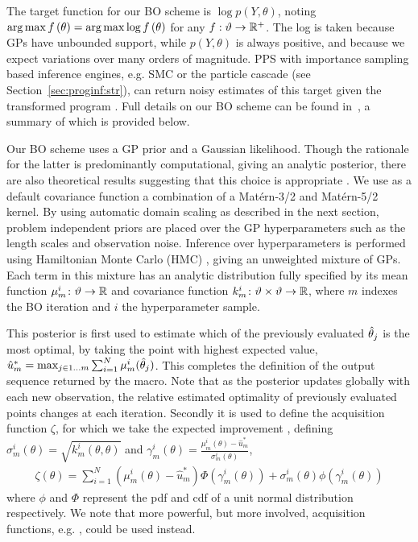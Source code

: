 
The target function for our BO scheme is $\log p(Y,\theta)$, noting $\operatorname*{arg\,max} f\left(\theta\right) = \operatorname*{arg\,max} \log f\left(\theta\right)$ for any $f : \vartheta \rightarrow \mathbb{R}^+$.  The log is taken because GPs have unbounded support, while $p\left(Y,\theta\right)$ is always positive, and because we expect variations over many orders of magnitude.  PPS with importance sampling based inference engines, e.g. SMC or the particle cascade (see Section~\ref{sec:proginf:str}), can return noisy estimates of this target given the transformed program \qmarg.   Full details on our BO scheme can be found
in~\cite{rainforth2017boppArxiv}, a summary of which is provided below.

Our BO scheme uses a GP prior and a Gaussian likelihood.  Though the rationale for the latter is predominantly computational, giving an analytic posterior, there are also theoretical results suggesting that this choice is appropriate \cite{berard2014lognormal}. We use as a default covariance function a combination of a Mat\'{e}rn-3/2 and Mat\'{e}rn-5/2 kernel. By using automatic domain scaling as described in the next section, problem independent priors are placed over the GP hyperparameters such as the length scales and observation noise.  Inference over hyperparameters is performed using Hamiltonian Monte Carlo (HMC) \citep{duane1987hybrid}, giving an unweighted mixture of GPs.  Each term in this mixture has an analytic distribution fully specified by its mean function $\mu_m^i \colon \vartheta \rightarrow \mathbb{R}$ and covariance function $k_m^i \colon \vartheta \times \vartheta \rightarrow \mathbb{R}$, where $m$ indexes the BO iteration and $i$ the hyperparameter sample.

This posterior is first used to estimate which of the previously evaluated $\hat{\theta}_j$ is the most optimal, by taking the point with highest expected value, $\hat{u}^*_m = \max_{j\in1\dots m} \sum_{i=1}^{N} \mu_{m}^i (\hat{\theta}_j)$.  This completes the definition of the output sequence returned by the \doopt macro.  Note that as the posterior updates globally with each new observation, the relative estimated optimality of previously evaluated points changes at each iteration.
Secondly it is used to define the acquisition function $\zeta$, for which we take the expected improvement \cite{snoek2012practical}, defining $\sigma_m^i\left(\theta\right) = \sqrt{k_m^i\left(\theta,\theta\right)}$ and $\gamma_m^i\left(\theta\right) = \frac{\mu_m^i \left(\theta\right)-\hat{u}_m^*}{\sigma_m^i\left(\theta\right)}$,
\begin{align}
\label{eq:exp-imp}
\zeta \left(\theta\right) = \sum_{i=1}^{N} \left(\mu_m^i\left(\theta\right)-\hat{u}_m^*\right)\Phi \left(\gamma_m^i\left(\theta\right)\right)+\sigma_m^i\left(\theta\right)\phi\left(\gamma_m^i\left(\theta\right)\right)
\end{align}
where $\phi$ and $\Phi$ represent the pdf and cdf of a unit normal distribution respectively.   We note that more powerful, but more involved, acquisition functions, e.g. \cite{hernandez2014predictive}, could be used instead.
